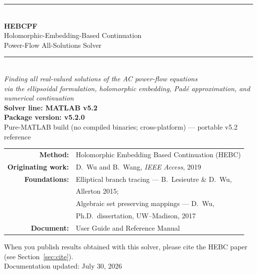 \documentclass[11pt,a4paper]{article}
\begin{document}
\begin{titlepage}
\centering
\vspace*{2.2cm}
{\color{rule}\rule{\textwidth}{1.2pt}}\\[8pt]
{\Huge\bfseries HEBCPF}\\[10pt]
{\LARGE Holomorphic-Embedding-Based Continuation}\\[4pt]
{\LARGE Power-Flow All-Solutions Solver}\\[10pt]
{\color{rule}\rule{\textwidth}{1.2pt}}\\[18pt]
{\large\itshape Finding \emph{all} real-valued solutions of the AC power-flow equations}\\[6pt]
{\large\itshape via the ellipsoidal formulation, holomorphic embedding, Pad\'e approximation, and numerical continuation}\\[26pt]

{\large\bfseries Solver line: MATLAB v5.2}\\[2pt]
{\large\bfseries Package version: v5.2.0}\\[4pt]
{\large Pure-MATLAB build (no compiled binaries; cross-platform) --- portable v5.2 reference}\\[12pt]

\begin{tabular}{rl}
\textbf{Method:} & Holomorphic Embedding Based Continuation (HEBC)\\[3pt]
\textbf{Originating work:} & D.\ Wu and B.\ Wang, \emph{IEEE Access}, 2019\\[6pt]
\textbf{Foundations:} & Elliptical branch tracing --- B.\ Lesieutre \& D.\ Wu,\\[1pt]
                      & Allerton 2015;\\[3pt]
                      & Algebraic set preserving mappings --- D.\ Wu,\\[1pt]
                      & Ph.D.\ dissertation, UW--Madison, 2017\\[6pt]
\textbf{Document:} & User Guide and Reference Manual\\
\end{tabular}

\vfill
{\small When you publish results obtained with this solver, please cite the HEBC
paper (see Section~\ref{sec:cite}).}\\[6pt]
{\small Documentation updated: July 30, 2026}
\end{titlepage}

\tableofcontents
\newpage
\end{document}
